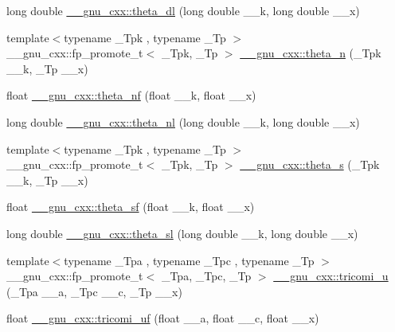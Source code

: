\begin{DoxyCompactItemize}
\item 
long double \hyperlink{group__mathsf__gnu_gacce4474168b9638ebeaad1c7b351fa04}{\+\_\+\+\_\+gnu\+\_\+cxx\+::theta\+\_\+dl} (long double \+\_\+\+\_\+k, long double \+\_\+\+\_\+x)
\item 
{\footnotesize template$<$typename \+\_\+\+Tpk , typename \+\_\+\+Tp $>$ }\\\+\_\+\+\_\+gnu\+\_\+cxx\+::fp\+\_\+promote\+\_\+t$<$ \+\_\+\+Tpk, \+\_\+\+Tp $>$ \hyperlink{group__mathsf__gnu_ga202778bd650e04e9f3729bfca35c32e2}{\+\_\+\+\_\+gnu\+\_\+cxx\+::theta\+\_\+n} (\+\_\+\+Tpk \+\_\+\+\_\+k, \+\_\+\+Tp \+\_\+\+\_\+x)
\item 
float \hyperlink{group__mathsf__gnu_ga5298a95e02bd909d55e59c1f2a0b51f8}{\+\_\+\+\_\+gnu\+\_\+cxx\+::theta\+\_\+nf} (float \+\_\+\+\_\+k, float \+\_\+\+\_\+x)
\item 
long double \hyperlink{group__mathsf__gnu_ga907f6c147387d55d2dfccbc58d1f1bc5}{\+\_\+\+\_\+gnu\+\_\+cxx\+::theta\+\_\+nl} (long double \+\_\+\+\_\+k, long double \+\_\+\+\_\+x)
\item 
{\footnotesize template$<$typename \+\_\+\+Tpk , typename \+\_\+\+Tp $>$ }\\\+\_\+\+\_\+gnu\+\_\+cxx\+::fp\+\_\+promote\+\_\+t$<$ \+\_\+\+Tpk, \+\_\+\+Tp $>$ \hyperlink{group__mathsf__gnu_gaf28f2dca107531890b49cccf2bdd67be}{\+\_\+\+\_\+gnu\+\_\+cxx\+::theta\+\_\+s} (\+\_\+\+Tpk \+\_\+\+\_\+k, \+\_\+\+Tp \+\_\+\+\_\+x)
\item 
float \hyperlink{group__mathsf__gnu_ga5e69cf30c9a4cc057accc43e8c4bf7a3}{\+\_\+\+\_\+gnu\+\_\+cxx\+::theta\+\_\+sf} (float \+\_\+\+\_\+k, float \+\_\+\+\_\+x)
\item 
long double \hyperlink{group__mathsf__gnu_gac574077067a4e7b24a0a9ff2d537d885}{\+\_\+\+\_\+gnu\+\_\+cxx\+::theta\+\_\+sl} (long double \+\_\+\+\_\+k, long double \+\_\+\+\_\+x)
\item 
{\footnotesize template$<$typename \+\_\+\+Tpa , typename \+\_\+\+Tpc , typename \+\_\+\+Tp $>$ }\\\+\_\+\+\_\+gnu\+\_\+cxx\+::fp\+\_\+promote\+\_\+t$<$ \+\_\+\+Tpa, \+\_\+\+Tpc, \+\_\+\+Tp $>$ \hyperlink{group__mathsf__gnu_gaf51a13fad85006e4d65c5b117e49f7d8}{\+\_\+\+\_\+gnu\+\_\+cxx\+::tricomi\+\_\+u} (\+\_\+\+Tpa \+\_\+\+\_\+a, \+\_\+\+Tpc \+\_\+\+\_\+c, \+\_\+\+Tp \+\_\+\+\_\+x)
\item 
float \hyperlink{group__mathsf__gnu_gab6eb5ec587642bf0952d6c3df1c64904}{\+\_\+\+\_\+gnu\+\_\+cxx\+::tricomi\+\_\+uf} (float \+\_\+\+\_\+a, float \+\_\+\+\_\+c, float \+\_\+\+\_\+x)
\item 

\end{DoxyCompactItemize}
